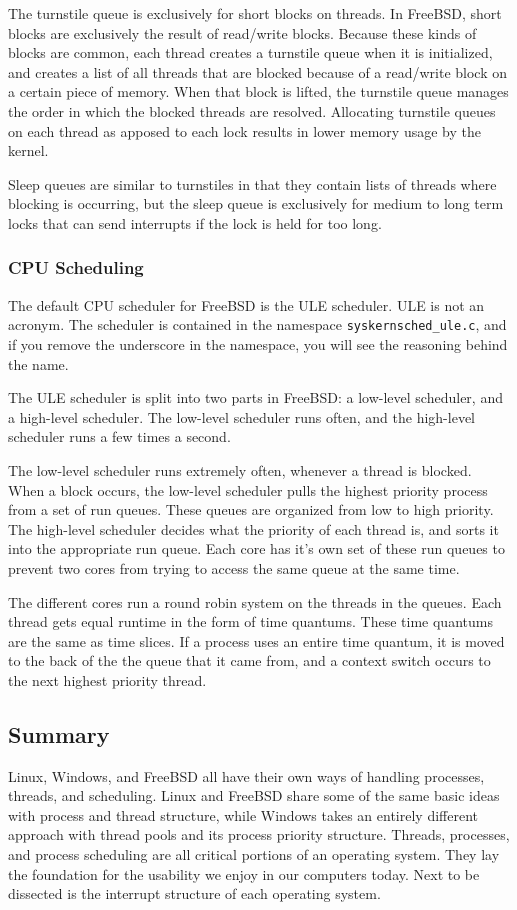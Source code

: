 \documentclass[10pt,letterpaper,onecolumn,draftclsnofoot]{IEEEtran}
\begin{document}
The turnstile queue is exclusively for short blocks on threads. In FreeBSD, short
blocks are exclusively the result of read/write blocks. Because these kinds of
blocks are common, each thread creates a turnstile queue when it is initialized,
and creates a list of all threads that are blocked because of a read/write block
on a certain piece of memory. When that block is lifted, the turnstile queue manages
the order in which the blocked threads are resolved. Allocating turnstile queues
on each thread as apposed to each lock results in lower memory usage by the kernel.

Sleep queues are similar to turnstiles in that they contain lists of threads
where blocking is occurring, but the sleep queue is exclusively for medium to long
term locks that can send interrupts if the lock is held for too long. \cite{kirkgeorgebsd}
\subsubsection{CPU Scheduling}
The default CPU scheduler for FreeBSD is the ULE scheduler. ULE is not an acronym.
\cite{kirkgeorgebsd} The scheduler is contained in the namespace
\texttt{\/sys\/kern\/sched\_ule.c}, and if you remove the underscore in the namespace,
you will see the reasoning behind the name.

The ULE scheduler is split into two parts in FreeBSD: a low-level scheduler, and
a high-level scheduler. The low-level scheduler runs often, and the high-level
scheduler runs a few times a second.

The low-level scheduler runs extremely often, whenever a thread is blocked. When
a block occurs, the low-level scheduler pulls the highest priority process from
a set of run queues. These queues are organized from low to high priority. The
high-level scheduler decides what the priority of each thread is, and sorts it
into the appropriate run queue. Each core has it's own set of these run queues
to prevent two cores from trying to access the same queue at the same time.

The different cores run a round robin system on the threads in the queues. Each
thread gets equal runtime in the form of time quantums. These time quantums are
the same as time slices. If a process uses an entire time quantum, it is moved
to the back of the the queue that it came from, and a context switch occurs to the
next highest priority thread.\cite{kirkgeorgebsd}

\subsection{Summary}
Linux, Windows, and FreeBSD all have their own ways of handling processes, threads, and scheduling. Linux and FreeBSD share some of the same basic ideas with process and thread structure, while Windows takes an entirely different approach with thread pools and its process priority structure. Threads, processes, and process scheduling are all critical portions of an operating system. They lay the foundation for the usability we enjoy in our computers today. Next to be dissected is the interrupt structure of each operating
system.
\end{document}
